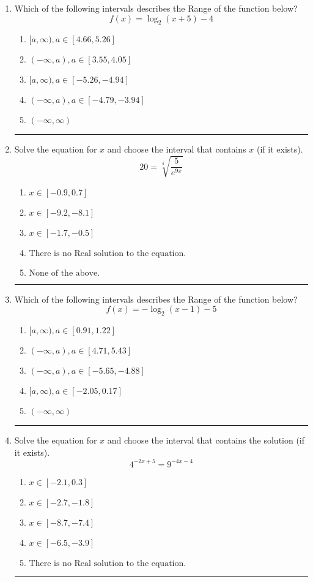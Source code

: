 \documentclass[14pt]{extbook}
\newcommand{\litem}[1]{\item#1\hspace*{-1cm}\rule{\textwidth}{0.4pt}}
\begin{document}
\begin{enumerate}
{\begin{enumerate}[label=\Alph*.]
\end{enumerate} }
\litem{
Which of the following intervals describes the Range of the function below?\[ f(x) = \log_2{(x+5)}-4 \]\begin{enumerate}[label=\Alph*.]
\item \( [a, \infty), a \in [4.66, 5.26] \)
\item \( (-\infty, a), a \in [3.55, 4.05] \)
\item \( [a, \infty), a \in [-5.26, -4.94] \)
\item \( (-\infty, a), a \in [-4.79, -3.94] \)
\item \( (-\infty, \infty) \)

\end{enumerate} }
\litem{
 Solve the equation for $x$ and choose the interval that contains $x$ (if it exists).\[  20 = \sqrt[4]{\frac{5}{e^{9x}}} \]\begin{enumerate}[label=\Alph*.]
\item \( x \in [-0.9, 0.7] \)
\item \( x \in [-9.2, -8.1] \)
\item \( x \in [-1.7, -0.5] \)
\item \( \text{There is no Real solution to the equation.} \)
\item \( \text{None of the above.} \)

\end{enumerate} }
\litem{
Which of the following intervals describes the Range of the function below?\[ f(x) = -\log_2{(x-1)}-5 \]\begin{enumerate}[label=\Alph*.]
\item \( [a, \infty), a \in [0.91, 1.22] \)
\item \( (-\infty, a), a \in [4.71, 5.43] \)
\item \( (-\infty, a), a \in [-5.65, -4.88] \)
\item \( [a, \infty), a \in [-2.05, 0.17] \)
\item \( (-\infty, \infty) \)

\end{enumerate} }
\litem{
Solve the equation for $x$ and choose the interval that contains the solution (if it exists).\[ 4^{-2x+5} = 9^{-4x-4} \]\begin{enumerate}[label=\Alph*.]
\item \( x \in [-2.1, 0.3] \)
\item \( x \in [-2.7, -1.8] \)
\item \( x \in [-8.7, -7.4] \)
\item \( x \in [-6.5, -3.9] \)
\item \( \text{There is no Real solution to the equation.} \)


\end{enumerate}}
\end{enumerate}
\end{document}
